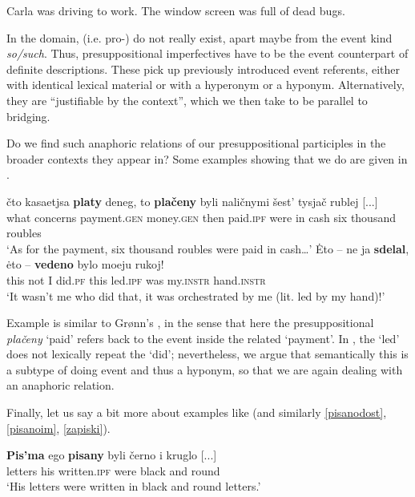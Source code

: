 \documentclass[output=paper,modfonts,newtxmath,hidelinks]{langscibook}
\begin{document}
\ea
Carla was driving to work. The window screen was full of dead bugs.\label{Carla}
\z

\noindent In the  domain,  (i.e. pro-)  do not really exist, apart maybe from the event kind  \textit{so/such}. Thus, presuppositional imperfectives have to be the event counterpart of definite descriptions. These pick up previously introduced event referents, either with identical lexical material or with a hyperonym or a hyponym. Alternatively, they are ``justifiable by the context'', which we then take to be parallel to bridging.

Do we  find such anaphoric relations of our presuppositional  participles in the broader contexts they appear in? Some examples showing that we do are given in .

\ea\label{anaphOF}
\ea\gll 	čto kasaetjsa \textbf{platy} deneg, to \textbf{plačeny} byli naličnymi šest' tysjač rublej [...]\\
	what concerns payment.\textsc{gen} money.\textsc{gen} then paid.\textsc{ipf} were {in cash} six thousand roubles\\
\glt	`As for the payment, six thousand roubles were paid in cash\dots'\label{platy}
\ex\gll 	\.{E}to -- ne ja \textbf{sdelal}, \.{e}to -- \textbf{vedeno} bylo moeju rukoj!\\
	this {} not I did.\textsc{pf} this {} led.\textsc{ipf} was my.\textsc{instr} hand.\textsc{instr}\\
\glt	`It wasn't me who did that, it was orchestrated by me (lit. led by my hand)!'\label{rukoj}	
\z\z

\noindent Example  is similar to Grønn's , in the sense that here the presuppositional   \textit{plačeny} `paid' refers back to the event inside the related  `payment'. In , the  `led' does not lexically repeat the  `did'; nevertheless, we argue that semantically this is a subtype of doing event and thus a hyponym, so that we are again dealing with an anaphoric relation. 

Finally, let us say a bit more about examples like  (and similarly \ref{pisanodost}, \ref{pisanoim}, \ref{zapiski}). 

\ea\gll	\textbf{Pis'ma} ego \textbf{pisany} byli černo i kruglo [...]\\
	letters his written.\textsc{ipf} were black and round \\
\glt	`His letters were written in black and round letters.'\label{kruglo}
\z
\end{document}
